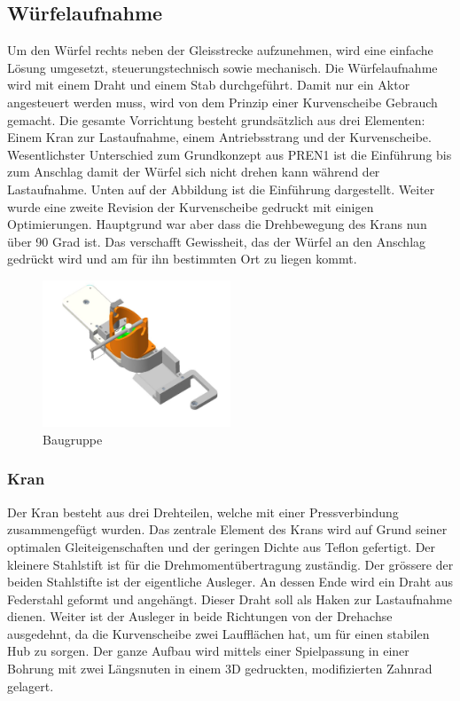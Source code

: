 \documentclass[../../main.tex]{subfiles}
\begin{document}
\subsection{Würfelaufnahme} \label{mt_wuerfel}
Um den Würfel rechts neben der Gleisstrecke aufzunehmen, wird eine einfache Lösung umgesetzt, steuerungstechnisch sowie mechanisch. Die Würfelaufnahme wird mit einem Draht und einem Stab durchgeführt. Damit nur ein Aktor angesteuert werden muss, wird von dem Prinzip einer Kurvenscheibe Gebrauch gemacht. Die gesamte Vorrichtung besteht grundsätzlich aus drei Elementen: Einem Kran zur Lastaufnahme, einem Antriebsstrang und der Kurvenscheibe. Wesentlichster Unterschied zum Grundkonzept aus PREN1 ist die Einführung bis zum Anschlag damit der Würfel sich nicht drehen kann während der Lastaufnahme. Unten auf der Abbildung ist die Einführung dargestellt. Weiter wurde eine zweite Revision der Kurvenscheibe gedruckt mit einigen Optimierungen. Hauptgrund war aber dass die Drehbewegung des Krans nun über 90 Grad ist. Das verschafft Gewissheit, das der Würfel an den Anschlag gedrückt wird und am für ihn bestimmten Ort zu liegen kommt.\\

        \begin{figure}[H]
            \centering
            \includegraphics[width=0.5\textwidth]{FahrgestellBG.JPG}
            \caption {Baugruppe}
        \end{figure}

    \subsubsection{Kran}
         Der Kran besteht aus drei Drehteilen, welche mit einer Pressverbindung zusammengefügt wurden. Das zentrale Element des Krans wird auf Grund seiner optimalen Gleiteigenschaften und der geringen Dichte aus Teflon gefertigt. Der kleinere Stahlstift ist für die Drehmomentübertragung zuständig. Der grössere der beiden Stahlstifte ist der eigentliche Ausleger. An dessen Ende wird ein Draht aus Federstahl geformt und angehängt. Dieser Draht soll als Haken zur Lastaufnahme dienen. Weiter ist der Ausleger in beide Richtungen von der Drehachse ausgedehnt, da die Kurvenscheibe zwei Laufflächen hat, um für einen stabilen Hub zu sorgen. Der ganze Aufbau wird mittels einer Spielpassung in einer Bohrung mit zwei Längsnuten in einem 3D gedruckten, modifizierten Zahnrad gelagert.
\end{document}
